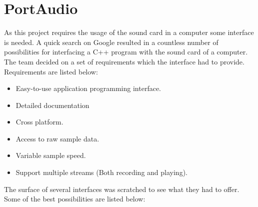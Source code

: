 \chapter{PortAudio}\label{chap:lib}\label{app:portaudio}
As this project requires the usage of the sound card in a computer some interface is needed. A quick search on Google resulted in a countless number of possibilities for interfacing a C++ program with the sound card of a computer. The team decided on a set of requirements which the interface had to provide. Requirements are listed below:

\begin{itemize}
\item Easy-to-use application programming interface.
\item Detailed documentation
\item Cross platform.
\item Access to raw sample data.
\item Variable sample speed.
\item Support multiple streams (Both recording and playing).
\end{itemize}

The surface of several interfaces was scratched to see what they had to offer. Some of the best possibilities are listed below:

